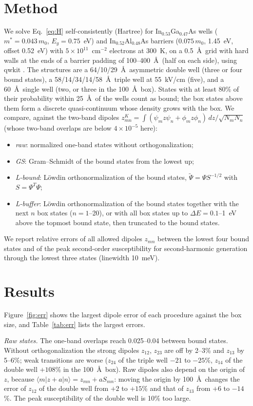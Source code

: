 \documentclass[11pt]{article}
\begin{document}
\section{Method}
We solve Eq.~\eqref{eq:H} self-consistently (Hartree) for In$_{0.53}$Ga$_{0.47}$As wells ($m^*=0.043\,m_0$, $E_g=0.75$~eV) and In$_{0.52}$Al$_{0.48}$As barriers ($0.075\,m_0$, 1.45~eV, offset 0.52~eV) with $5\times10^{11}$~cm$^{-2}$ electrons at 300~K, on a 0.5~\AA\ grid with hard walls at the ends of a barrier padding of 100--400~\AA\ (half on each side), using qwkit \cite{qwkit}. The structures are a 64/10/29~\AA\ asymmetric double well (three or four bound states), a 58/14/34/14/58~\AA\ triple well at 55~kV/cm (five), and a 60~\AA\ single well (two, or three in the 100~\AA\ box). States with at least 80\% of their probability within 25~\AA\ of the wells count as bound; the box states above them form a discrete quasi-continuum whose density grows with the box. We compare, against the two-band dipoles $z^K_{mn}=\int(\psi_mz\psi_n+\phi_mz\phi_n)\,dz/\sqrt{N_mN_n}$ (whose two-band overlaps are below $4\times10^{-5}$ here):
\begin{itemize}
\item \emph{raw}: normalized one-band states without orthogonalization;
\item \emph{GS}: Gram--Schmidt of the bound states from the lowest up;
\item \emph{L-bound}: L\"owdin orthonormalization of the bound states, $\tilde\Psi=\Psi S^{-1/2}$ with $S=\Psi^T\Psi$;
\item \emph{L-buffer}: L\"owdin orthonormalization of the bound states together with the next $n$ box states ($n=1$--20), or with all box states up to $\Delta E=0.1$--1~eV above the topmost bound state, then truncated to the bound states.
\end{itemize}
We report relative errors of all allowed dipoles $z_{mn}$ between the lowest four bound states and of the peak second-order susceptibility for second-harmonic generation through the lowest three states (linewidth 10~meV).

\section{Results}
Figure~\ref{fig:err} shows the largest dipole error of each procedure against the box size, and Table~\ref{tab:err} lists the largest errors.

\emph{Raw states.} The one-band overlaps reach 0.025--0.04 between bound states. Without orthogonalization the strong dipoles $z_{12}$, $z_{23}$ are off by 2--3\% and $z_{13}$ by 5--6\%; weak transitions are worse ($z_{24}$ of the triple well $-21$ to $-25$\%, $z_{14}$ of the double well $+108$\% in the 100~\AA\ box). Raw dipoles also depend on the origin of $z$, because $\langle m|z+a|n\rangle=z_{mn}+aS_{mn}$: moving the origin by 100~\AA\ changes the error of $z_{12}$ of the double well from $+2$ to $+15$\% and that of $z_{13}$ from $+6$ to $-14$\%. The peak susceptibility of the double well is 10\% too large.
\end{document}
